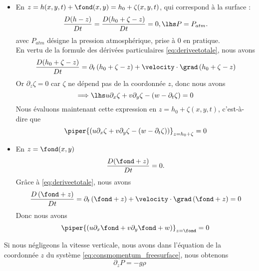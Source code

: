 \begin{itemize}
	\item En $z = h(x, y, t) + \fond(x, y) = h_0 + \zeta (x, y, t)$, qui correspond à la surface :\\
	\begin{equation}	
	\frac{D (h - z)}{D t} = \frac{D (h_0 + \zeta - z)}{D t} = 0,\lhs P = P_{atm}.
	\end{equation}
	avec $P_{atm}$ désigne la pression atmosphérique, prise à $0$ en pratique.\\
	En vertu de la formule des dérivées particulaires \eqref{eq:deriveetotale}, nous avons
	\begin{equation}
		\frac{D (h_0 + \zeta - z)}{D t} = \partial_t \left(h_0 + \zeta -z\right) + \velocity \cdot \grad \left(h_0 + \zeta -z \right)
	\end{equation}
	Or $\partial_z \zeta = 0$ car $\zeta$ ne dépend pas de la coordonnée $z$, donc nous avons
	\begin{equation}	
		\Longrightarrow\lhs u\partial_x \zeta + v \partial_y \zeta - \left( w - \partial_t\zeta\right) = 0
	\end{equation}
	Nous évaluons maintenant cette expression en $z= h_0 + \zeta (x, y, t)$, c'est-à-dire que
	\begin{equation}	
	 \piper{\left(u\partial_x \zeta + v \partial_y \zeta - \left(w - \partial_t\zeta\right)\right)}_{z = h_0 + \zeta} = 0 \label{eq:condmasssurf}
	\end{equation}
	\item En $z=\fond(x, y)$
	\begin{equation}
	\frac{D (\fond+z)}{D t} = 0.
	\end{equation}
	Grâce à \eqref{eq:deriveetotale}, nous avons
	\begin{equation}
		\frac{D \left(\fond + z\right)}{D t} = \partial_t \left( \fond + z\right) + \velocity \cdot \grad \left(\fond+z\right) = 0
	\end{equation}
	Donc nous avons
	\begin{equation}
		\piper{\left(u\partial_x \fond + v \partial_y \fond + w\right)}_{z = \fond} = 0 \label{eq:condmasssol}
	\end{equation}
\end{itemize}
Si nous négligeons la vitesse verticale, nous avons dans l'équation de la coordonnée $z$ du système \eqref{eq:consmomentum_freesurface}, nous obtenons
\begin{equation}
	\partial_z P = - g\rho
\end{equation}
